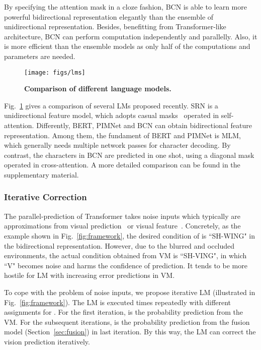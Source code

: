 \documentclass[10pt,journal,compsoc]{IEEEtran}
\begin{document}
By specifying the attention mask in a cloze fashion, BCN is able to learn more powerful bidirectional representation elegantly than the ensemble of unidirectional representation. Besides, benefitting from Transformer-like architecture, BCN can perform computation independently and parallelly. Also, it is more efficient than the ensemble models as only half of the computations and parameters are needed.


\begin{figure}
   \begin{center}
      \texttt{[image: figs/lms]}
      \caption{\textbf{Comparison of different language models.}}
      \label{fig:comparisons_lms}
   \end{center}
   \vspace{-1.5em}   
\end{figure}

Fig.~\ref{fig:comparisons_lms} gives a comparison of several LMs proposed recently. SRN is a unidirectional feature model, which adopts casual masks~\cite{radford2018improving} operated in self-attention. Differently, BERT, PIMNet and BCN can obtain bidirectional feature representation. Among them, the fundament of BERT and PIMNet is MLM, which generally needs multiple network passes for character decoding. By contrast, the characters in BCN are predicted in one shot, using a diagonal mask operated in cross-attention. A more detailed comparison can be found in the supplementary material.


\subsubsection{Iterative Correction}
\label{sec:iterative}


The parallel-prediction of Transformer takes noise inputs which typically are approximations from visual prediction~\cite{yu2020towards} or visual feature~\cite{lyu20192d}. Concretely, as the example shown in Fig.~\ref{fig:framework}, the desired condition of  is ``SH-WING" in the bidirectional representation. However, due to the blurred and occluded environments, the actual condition obtained from VM is ``SH-VING", in which ``V" becomes noise and harms the confidence of prediction. It tends to be more hostile for LM with increasing error predictions in VM.


To cope with the problem of noise inputs, we propose iterative LM (illustrated in Fig.~\ref{fig:framework}). The LM is executed  times repeatedly with different assignments for . For the first iteration,  is the probability prediction from the VM. For the subsequent iterations,  is the probability prediction from the fusion model (Section~\ref{sec:fusion}) in last iteration. By this way, the LM can correct the vision prediction iteratively.
\end{document}
